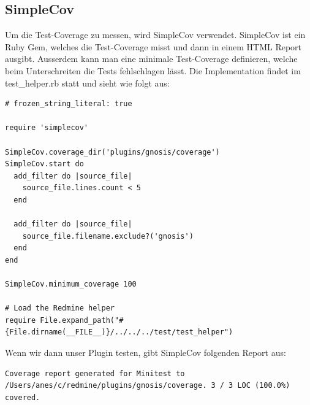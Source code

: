 \begin{minipage}{\textwidth}
  \subsection{SimpleCov}
  Um die Test-Coverage zu messen, wird SimpleCov verwendet. SimpleCov ist ein Ruby Gem, welches die Test-Coverage misst und
  dann in einem HTML Report ausgibt. Ausserdem kann man eine minimale Test-Coverage definieren, welche beim Unterschreiten
  die Tests fehlschlagen lässt. \newline
  Die Implementation findet im test\_helper.rb statt und sieht wie folgt aus:
  \begin{codebox}[]
    \begin{verbatim}
# frozen_string_literal: true

require 'simplecov'

SimpleCov.coverage_dir('plugins/gnosis/coverage')
SimpleCov.start do
  add_filter do |source_file|
    source_file.lines.count < 5
  end

  add_filter do |source_file|
    source_file.filename.exclude?('gnosis')
  end
end

SimpleCov.minimum_coverage 100

# Load the Redmine helper
require File.expand_path("#{File.dirname(__FILE__)}/../../../test/test_helper")
    \end{verbatim}
  \end{codebox}

  Wenn wir dann unser Plugin testen, gibt SimpleCov folgenden Report aus:
  \begin{codebox}
    \begin{verbatim}
Coverage report generated for Minitest to /Users/anes/c/redmine/plugins/gnosis/coverage. 3 / 3 LOC (100.0%) covered.
    \end{verbatim}
  \end{codebox}
\end{minipage}

